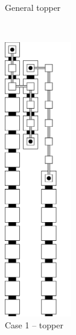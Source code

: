\begin{figure}[H]
\begin{subfigure}[t]{0.32\textwidth}
        \caption{\label{fig:topper_gen} General topper}
    \end{subfigure}%
    ~
    \begin{subfigure}[t]{0.32\textwidth}
        \centering
        \includegraphics[width=0.32\textwidth]{digit_top_case1_digit1_topper}
        \caption{\label{fig:topper_case1} Case 1 -- topper}
    \end{subfigure}%
    ~
    \begin{subfigure}[t]{0.32\textwidth}
        \centering

\end{subfigure}
\end{figure}
